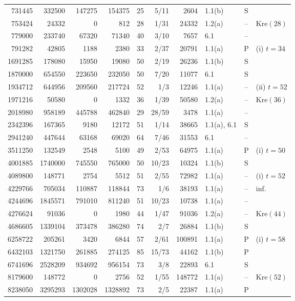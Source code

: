 \documentclass[11pt]{article}
\theoremstyle{definition}
\theoremstyle{remark}
\newcommand{\Kre}{\mathrm{Kre}}
\begin{document}
\begin{table}[H]
\begin{tabular}{rrrrrrrlcl}
731445&332500&147275&154375&25&5/11&2604&1.1(b)&S&\\
753424&24332&0&812&28&1/31&24332&1.2(a)&--&$\Kre(28)$\\
779000&233740&67320&71340&40&3/10&7657&6.1&--&\\
791282&42805&1188&2380&33&2/37&20791&1.1(a)&P&(i) $t{=}34$\\
1691285&178080&15950&19080&50&2/19&26236&1.1(b)&S&\\
1870000&654550&223650&232050&50&7/20&11077&6.1&S&\\
1934712&644956&209560&217724&52&1/3&12246&1.1(a)&--&(ii) $t{=}52$\\
1971216&50580&0&1332&36&1/39&50580&1.2(a)&--&$\Kre(36)$\\
2018980&958189&445788&462840&29&28/59&3478&1.1(a)&--&\\
2342396&167365&9180&12172&51&1/14&38665&1.1(a), 6.1&S&\\
2941240&447644&63168&69020&64&7/46&31553&6.1&--&\\
3511250&132549&2548&5100&49&2/53&64975&1.1(a)&P&(i) $t{=}50$\\
4001885&1740000&745550&765000&50&10/23&10324&1.1(b)&S&\\
4089800&148771&2754&5512&51&2/55&72982&1.1(a)&--&(i) $t{=}52$\\
4229766&705034&110887&118844&73&1/6&38193&1.1(a)&--&inf.\\
4244696&1845571&791010&811240&51&10/23&10738&1.1(a)&--&\\
4276624&91036&0&1980&44&1/47&91036&1.2(a)&--&$\Kre(44)$\\
4686605&1339104&373478&386280&74&2/7&26884&1.1(b)&S&\\
6258722&205261&3420&6844&57&2/61&100891&1.1(a)&P&(i) $t{=}58$\\
6432103&1321750&261885&274125&85&15/73&44162&1.1(b)&P&\\
6741696&2528209&934692&956154&73&3/8&22893&6.1&S&\\
8179600&148772&0&2756&52&1/55&148772&1.1(a)&--&$\Kre(52)$\\
8238050&3295293&1302028&1328892&73&2/5&22387&1.1(a)&P&\\
\bottomrule
\end{tabular}
\end{table}
\end{document}
